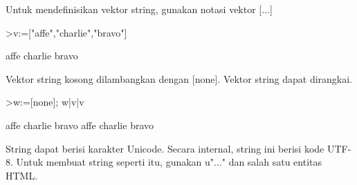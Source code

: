 \documentclass[a4paper,10pt]{article}
\begin{document}
\begin{eulernotebook}
\begin{eulercomment}
\begin{eulercomment}
\begin{eulercomment}
Untuk mendefinisikan vektor string, gunakan notasi vektor [...]
\end{eulercomment}
\begin{eulerprompt}
>v:=["affe","charlie","bravo"]
\end{eulerprompt}
\begin{euleroutput}
  affe
  charlie
  bravo
\end{euleroutput}
\begin{eulercomment}
Vektor string kosong dilambangkan dengan [none]. Vektor string dapat
dirangkai.
\end{eulercomment}
\begin{eulerprompt}
>w:=[none]; w|v|v
\end{eulerprompt}
\begin{euleroutput}
  affe
  charlie
  bravo
  affe
  charlie
  bravo
\end{euleroutput}
\begin{eulercomment}
String dapat berisi karakter Unicode. Secara internal, string ini
berisi kode UTF-8. Untuk membuat string seperti itu, gunakan u"..."
dan salah satu entitas HTML.


\end{eulercomment}
\end{eulercomment}
\end{eulercomment}
\end{eulernotebook}
\end{document}
